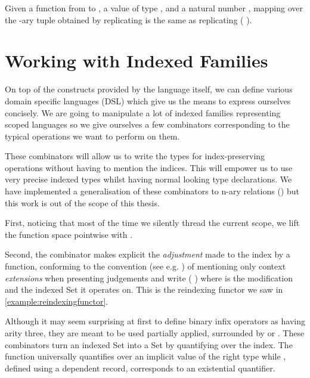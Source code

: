 \begin{lemma}
Given a function  from  to , a value  of type ,
and a natural number , mapping  over the -ary tuple obtained
by replicating  is the same as replicating ( ).
\end{lemma}




\section{Working with Indexed Families}
\label{sec:indexed-combinators}

On top of the constructs provided by the language itself, we can define various
domain specific languages (DSL) which give us the means to express ourselves
concisely. We are going to manipulate a lot of indexed families representing
scoped languages so we give ourselves a few combinators corresponding to the
typical operations we want to perform on them.

These combinators will allow us to write the types for index-preserving
operations without having to mention the indices. This will empower us
to use very precise indexed types whilst having normal looking type
declarations. We have implemented a generalisation of these combinators
to n-ary relations (\cite{DBLP:conf/icfp/Allais19}) but this work is out
of the scope of this thesis.



First, noticing that most of the time we silently thread the current scope, we lift
the function space pointwise with .


Second, the  combinator makes explicit the \emph{adjustment} made to the
index by a function, conforming to the convention (see e.g. \cite{martin1982constructive})
of mentioning only context \emph{extensions} when presenting judgements and write
({  }) where  is the modification and  the indexed
Set it operates on. This is the reindexing functor we saw in
\cref{example:reindexingfunctor}.


Although it may seem surprising at first to define binary infix operators as having
arity three, they are meant to be used partially applied, surrounded by 
or . These combinators turn an indexed Set into a Set by quantifying over
the index. The function  universally quantifies over an implicit value
of the right type while , defined using a dependent record, corresponds
to an existential quantifier.

